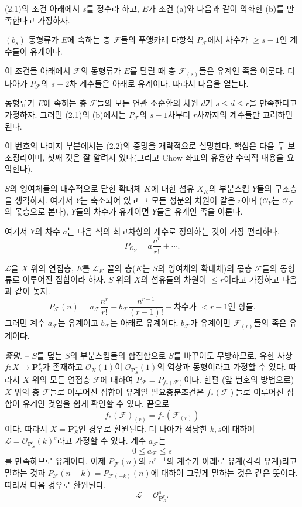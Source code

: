  (2.1)의 조건 아래에서 $s$를 정수라 하고, $E$가 조건
(a)와 다음과 같이 약화한 (b)를 만족한다고 가정하자.

\medskip
\noindent $(b_s)$ 동형류가 $E$에 속하는 층 $\mathcal F$들의 푸앵카레
다항식 $P_{\mathcal F}$에서 차수가 $\geq s-1$인 계수들이 유계이다.

이 조건들 아래에서 $\mathcal F$의 동형류가 $E$를 달릴 때 층
$\mathcal F_{(s)}$들은 유계인 족을 이룬다. 더 나아가
$P_{\mathcal F}$의 $s-2$차 계수들은 아래로 유계이다.
따라서 다음을 얻는다.

 동형류가 $E$에 속하는 층 $\mathcal F$들의 모든
연관 소순환의 차원 $d$가 $s\leq d\leq r$을 만족한다고 가정하자. 그러면
(2.1)의 (b)에서는 $P_{\mathcal F}$의 $s-1$차부터 $r$차까지의 계수들만
고려하면 된다.

이 번호의 나머지 부분에서는 (2.2)의 증명을 개략적으로 설명한다. 핵심은
다음 두 보조정리이며, 첫째 것은 잘 알려져 있다(그리고 Chow 좌표의 유용한
수학적 내용을 요약한다).

 $S$의 잉여체들의 대수적으로 닫힌 확대체
$K$에 대한 섬유 $X_K$의 부분스킴 $Y$들의 구조층을 생각하자. 여기서
$Y$는 축소되어 있고 그 모든 성분의 차원이 같은 $r$이며
($\mathcal O_Y$는 $\mathcal O_X$의 몫층으로 본다), $Y$들의 차수가
유계이면 $Y$들은 유계인 족을 이룬다.

여기서 $Y$의 차수 $a$는 다음 식의 최고차항의 계수로 정의하는 것이 가장
편리하다.
\[
P_{\mathcal O_Y}=a\frac{n^r}{r!}+\cdots.
\]

 $\mathcal L$을 $X$ 위의 연접층, $E$를
$\mathcal L_K$ 꼴의 층($K$는 $S$의 잉여체의 확대체)의 몫층
$\mathcal F$들의 동형류로 이루어진 집합이라 하자. $S$ 위의 $X$의
섬유들의 차원이 $\leq r$이라고 가정하고 다음과 같이 놓자.
\[
P_{\mathcal F}(n)=a_{\mathcal F}\frac{n^r}{r!}
+b_{\mathcal F}\frac{n^{r-1}}{(r-1)!}
+\text{차수가 $<r-1$인 항들}.
\]
그러면 계수 $a_{\mathcal F}$는 유계이고 $b_{\mathcal F}$는 아래로
유계이다. $b_{\mathcal F}$가 유계이면 $\mathcal F_{(r)}$들의 족은
유계이다.

\emph{증명.} -- $S$를 덮는 $S$의 부분스킴들의 합집합으로 $S$를
바꾸어도 무방하므로, 유한 사상
$f:X\longrightarrow\mathbf P^r_S$가 존재하고 $\mathcal O_X(1)$이
$\mathcal O_{\mathbf P^r_S}(1)$의 역상과 동형이라고 가정할 수 있다.
따라서 $X$ 위의 모든 연접층 $\mathcal F$에 대하여
$P_{\mathcal F}=P_{f_*(\mathcal F)}$이다. 한편 (앞 번호의 방법으로)
$X$ 위의 층 $\mathcal F$들로 이루어진 집합이 유계일 필요충분조건은
$f_*(\mathcal F)$들로 이루어진 집합이 유계인 것임을 쉽게 확인할 수
있다. 끝으로
\[
f_*(\mathcal F)_{(r)}=f_*(\mathcal F_{(r)})
\]
이다.
따라서 $X=\mathbf P^r_S$인 경우로 환원된다. 더 나아가 적당한 $k,s$에
대하여 $\mathcal L=\mathcal O_{\mathbf P^r_S}(k)^s$라고 가정할 수 있다.
계수 $a_{\mathcal F}$는
\[
0\leq a_{\mathcal F}\leq s
\]
를 만족하므로 유계이다. 이제 $P_{\mathcal F}(n)$의 $n^{r-1}$의
계수가 아래로 유계(각각 유계)라고 말하는 것과
$P_{\mathcal F}(n-k)=P_{\mathcal F(-k)}(n)$에 대하여 그렇게 말하는 것은
같은 뜻이다. 따라서 다음 경우로 환원된다.
\[
\mathcal L=\mathcal O_{\mathbf P^r_S}^{s}.
\]

